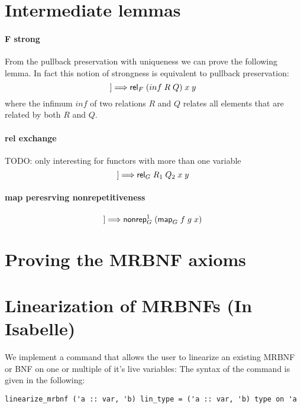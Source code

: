   \section{Intermediate lemmas}
    \paragraph{F strong} 
      From the pullback preservation with uniqueness we can prove the following lemma. In fact this notion of strongness is equivalent to pullback preservation: 
      \begin{equation*}
        [\![\text{\textsf{rel}}_F\; R\; x\; y;\; \text{\textsf{rel}}_F\; Q\; x\; y]\!] \Longrightarrow \text{\textsf{rel}}_F\; (inf\; R\; Q)\; x\; y
      \end{equation*} 
      where the infimum $inf$ of two relations $R$ and $Q$ relates all elements that are related by both $R$ and $Q$.

    \paragraph{rel exchange}
      TODO: only interesting for functors with more than one variable
      \begin{equation*}
        [\![\text{\textsf{rel}}_G\; R_1\; R_2\; x\; y;\; \text{\textsf{rel}}_G\; Q_1\; Q_2\; x\; y]\!] \Longrightarrow \text{\textsf{rel}}_G\; R_1\; Q_2\; x\; y
      \end{equation*} 

    \paragraph{map peresrving nonrepetitiveness}
      \begin{equation*}
        [\![\text{\textsf{nonrep}}_G^1\; x;\; \text{\textsf{bijective}} f]\!] \Longrightarrow \text{\textsf{nonrep}}_G^1\; (\text{\textsf{map}}_G\; f\; g\; x)
      \end{equation*} 
      

  \section{Proving the MRBNF axioms}  

  \section{Linearization of MRBNFs (In Isabelle)}
    We implement a command that allows the user to linearize an existing \ac{MRBNF} or \ac{BNF} on one or multiple of it's live variables:
    The syntax of the command is given in the following:
    \begin{lstlisting}
linearize_mrbnf ('a :: var, 'b) lin_type = ('a :: var, 'b) type on 'a
    \end{lstlisting}

    

  